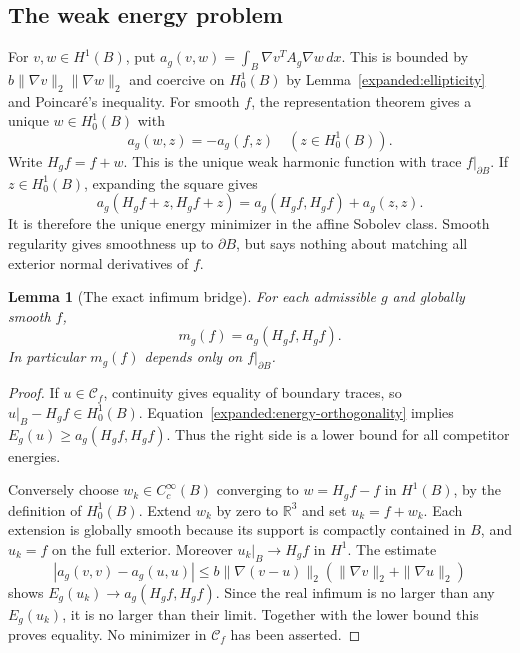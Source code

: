 \documentclass[11pt]{article}
\newtheorem{lemma}[theorem]{Lemma}
\theoremstyle{definition}
\theoremstyle{remark}
\numberwithin{equation}{section}
\begin{document}
\subsection{The weak energy problem}
For $v,w\in H^1(B)$, put
$a_g(v,w)=\int_B\nabla v^TA_g\nabla w\,dx$. This is bounded by
$b\|\nabla v\|_2\|\nabla w\|_2$ and coercive on $H^1_0(B)$ by
Lemma~\ref{expanded:ellipticity} and Poincar\'e's inequality. For smooth
$f$, the representation theorem gives a unique $w\in H^1_0(B)$ with
\[
 a_g(w,z)=-a_g(f,z)\quad(z\in H^1_0(B)).
\]
Write $H_gf=f+w$. This is the unique weak harmonic function with trace
$f|_{\partial B}$. If $z\in H^1_0(B)$, expanding the square gives
\begin{equation}\label{expanded:energy-orthogonality}
 a_g(H_gf+z,H_gf+z)=a_g(H_gf,H_gf)+a_g(z,z).
\end{equation}
It is therefore the unique energy minimizer in the affine Sobolev class.
Smooth regularity gives smoothness up to $\partial B$, but says nothing
about matching all exterior normal derivatives of $f$.

\begin{lemma}[The exact infimum bridge]\label{expanded:infimum}
For each admissible $g$ and globally smooth $f$,
\[
 m_g(f)=a_g(H_gf,H_gf).
\]
In particular $m_g(f)$ depends only on $f|_{\partial B}$.
\end{lemma}
\begin{proof}
If $u\in\mathcal C_f$, continuity gives equality of boundary traces, so
$u|_B-H_gf\in H^1_0(B)$. Equation~\eqref{expanded:energy-orthogonality}
implies $E_g(u)\geq a_g(H_gf,H_gf)$. Thus the right side is a lower
bound for all competitor energies.

Conversely choose $w_k\in C_c^\infty(B)$ converging to
$w=H_gf-f$ in $H^1(B)$, by the definition of $H^1_0(B)$. Extend $w_k$
by zero to $\mathbb R^3$ and set $u_k=f+w_k$. Each extension is globally
smooth because its support is compactly contained in $B$, and
$u_k=f$ on the full exterior. Moreover $u_k|_B\to H_gf$ in $H^1$.
The estimate
\[
 |a_g(v,v)-a_g(u,u)|
 \leq b\|\nabla(v-u)\|_2
             (\|\nabla v\|_2+\|\nabla u\|_2)
\]
shows $E_g(u_k)\to a_g(H_gf,H_gf)$. Since the real infimum is no
larger than any $E_g(u_k)$, it is no larger than their limit. Together
with the lower bound this proves equality. No minimizer in
$\mathcal C_f$ has been asserted.
\end{proof}
\end{document}
